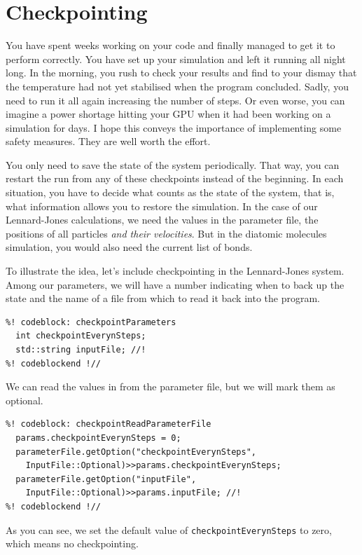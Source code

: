 \section{Checkpointing}

You have spent weeks working on your code and finally managed to get it to 
perform correctly. You have set up your simulation and left it running all night 
long. In the morning, you rush to check your results and find to your dismay 
that the temperature had not yet stabilised when the program concluded. Sadly, 
you need to run it all again increasing the number of steps. Or even worse, you 
can imagine a power shortage hitting your GPU when it had been working on a 
simulation for days. I hope this conveys the importance of implementing some 
safety measures. They are well worth the effort.

You only need to save the state of the system periodically. That way, you can 
restart the run from any of these checkpoints instead of the beginning. In each 
situation, you have to decide what counts as the state of the system, that is, 
what information allows you to restore the simulation. In the case of our 
Lennard-Jones calculations, we need the values in the parameter file, the 
positions of all particles \textit{and their velocities}. But in the diatomic 
molecules simulation, you would also need the current list of bonds.

To illustrate the idea, let's include checkpointing in the Lennard-Jones system.
Among our parameters, we will have a number indicating when to back up the 
state and the name of a file from which to read it back into the program.
\begin{lstlisting}
%! codeblock: checkpointParameters
  int checkpointEverynSteps;
  std::string inputFile; //!
%! codeblockend !//
\end{lstlisting}
We can read the values in from the parameter file, but we will mark them as 
optional.
\begin{lstlisting}
%! codeblock: checkpointReadParameterFile
  params.checkpointEverynSteps = 0;
  parameterFile.getOption("checkpointEverynSteps",
    InputFile::Optional)>>params.checkpointEverynSteps;
  parameterFile.getOption("inputFile",
    InputFile::Optional)>>params.inputFile; //!
%! codeblockend !//
\end{lstlisting}
As you can see, we set the default value of \texttt{checkpointEverynSteps} to 
zero, which means no checkpointing.

